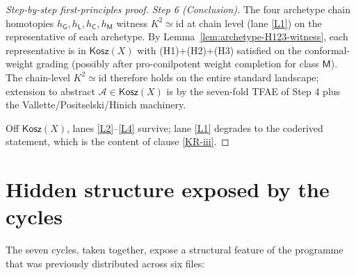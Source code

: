 \documentclass[11pt]{article}
\theoremstyle{definition}
\newcommand{\Kosz}{\mathsf{Kosz}}
\newcommand{\id}{\mathrm{id}}
\newcommand{\cA}{\mathcal{A}}
\begin{document}
\begin{proof}[Step-by-step first-principles proof]
\emph{Step 6 (Conclusion).}
The four archetype chain homotopies $h_\mathsf{G},h_\mathsf{L},h_\mathsf{C},h_\mathsf{M}$
witness $K^{2}\simeq\id$ at chain level (lane \ref{L1}) on the
representative of each archetype. By
Lemma~\ref{lem:archetype-H123-witness}, each representative is in
$\Kosz(X)$ with (H1)+(H2)+(H3) satisfied on the
conformal-weight grading (possibly after pro-conilpotent
weight completion for class $\mathsf{M}$). The chain-level
$K^{2}\simeq\id$ therefore holds on the entire standard
landscape; extension to abstract $\cA\in\Kosz(X)$ is by the
seven-fold TFAE of Step 4 plus the Vallette/Positselski/Hinich
machinery.

Off $\Kosz(X)$, lanes \ref{L2}--\ref{L4} survive; lane \ref{L1}
degrades to the coderived statement, which is the content of
clause \ref{KR-iii}.
\end{proof}

\section*{Hidden structure exposed by the cycles}

The seven cycles, taken together, expose a structural feature of
the programme that was previously distributed across six files:
\end{document}
